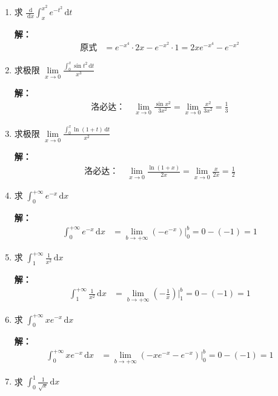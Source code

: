 \documentclass[12pt,a4paper]{article}
\newcommand{\dd}{\,\mathrm{d}}
\begin{document}
\begin{enumerate}[label=\textbf{\arabic*.}, leftmargin=*, itemsep=1.2em]
\item 求 $\displaystyle \frac{\dd}{\dd x}\int_x^{x^2} e^{-t^2}\dd t$

\textbf{解：}
\begin{align*}
\text{原式} &= e^{-x^4}\cdot 2x - e^{-x^2}\cdot 1 = 2x e^{-x^4} - e^{-x^2}
\end{align*}

\item 求极限 $\displaystyle \lim\limits_{x\to 0}\frac{\int_0^x \sin t^2 \dd t}{x^3}$

\textbf{解：}
\begin{align*}
\text{洛必达：} \quad \lim_{x\to 0}\frac{\sin x^2}{3x^2} = \lim_{x\to 0}\frac{x^2}{3x^2} = \frac{1}{3}
\end{align*}

\item 求极限 $\displaystyle \lim\limits_{x\to 0}\frac{\int_0^x \ln(1+t)\dd t}{x^2}$

\textbf{解：}
\begin{align*}
\text{洛必达：} \quad \lim_{x\to 0}\frac{\ln(1+x)}{2x} = \lim_{x\to 0}\frac{x}{2x} = \frac{1}{2}
\end{align*}

\item 求 $\displaystyle \int_0^{+\infty} e^{-x}\dd x$

\textbf{解：}
\begin{align*}
\int_0^{+\infty} e^{-x}\dd x &= \lim\limits_{b\to +\infty} \left(-e^{-x}\right)\big|_0^b = 0 - (-1) = 1
\end{align*}

\item 求 $\displaystyle \int_1^{+\infty} \frac{1}{x^2}\dd x$

\textbf{解：}
\begin{align*}
\int_1^{+\infty} \frac{1}{x^2}\dd x &= \lim\limits_{b\to +\infty} \left(-\frac{1}{x}\right)\big|_1^b = 0 - (-1) = 1
\end{align*}

\item 求 $\displaystyle \int_0^{+\infty} x e^{-x}\dd x$

\textbf{解：}
\begin{align*}
\int_0^{+\infty} x e^{-x}\dd x &= \lim\limits_{b\to +\infty} \left(-x e^{-x}-e^{-x}\right)\big|_0^b = 0 - (-1) = 1
\end{align*}

\item 求 $\displaystyle \int_0^1 \frac{1}{\sqrt{x}}\dd x$


\end{enumerate}
\end{document}
